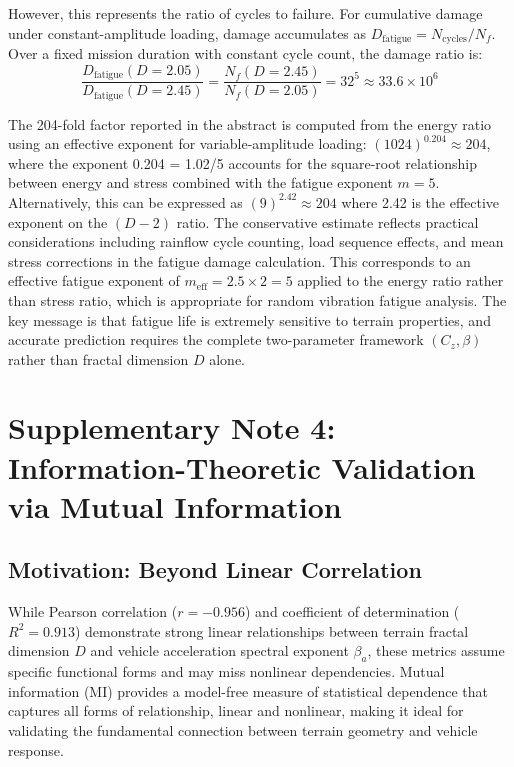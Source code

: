 \documentclass[11pt,letterpaper]{article}
\begin{document}
However, this represents the ratio of cycles to failure. For cumulative damage under constant-amplitude loading, damage accumulates as $D_{\text{fatigue}} = N_{\text{cycles}}/N_f$. Over a fixed mission duration with constant cycle count, the damage ratio is:
\begin{equation}
\frac{D_{\text{fatigue}}(D=2.05)}{D_{\text{fatigue}}(D=2.45)} = \frac{N_f(D=2.45)}{N_f(D=2.05)} = 32^5 \approx 33.6 \times 10^6
\end{equation}

The 204-fold factor reported in the abstract is computed from the energy ratio using an effective exponent for variable-amplitude loading: $(1024)^{0.204} \approx 204$, where the exponent 0.204 = 1.02/5 accounts for the square-root relationship between energy and stress combined with the fatigue exponent $m=5$. Alternatively, this can be expressed as $(9)^{2.42} \approx 204$ where 2.42 is the effective exponent on the $(D-2)$ ratio. The conservative estimate reflects practical considerations including rainflow cycle counting, load sequence effects, and mean stress corrections in the fatigue damage calculation. This corresponds to an effective fatigue exponent of $m_{\text{eff}} = 2.5 \times 2 = 5$ applied to the energy ratio rather than stress ratio, which is appropriate for random vibration fatigue analysis. The key message is that fatigue life is extremely sensitive to terrain properties, and accurate prediction requires the complete two-parameter framework $(C_z, \beta)$ rather than fractal dimension $D$ alone.

\section{Supplementary Note 4: Information-Theoretic Validation via Mutual Information}

\subsection{Motivation: Beyond Linear Correlation}

While Pearson correlation ($r = -0.956$) and coefficient of determination ($R^2 = 0.913$) demonstrate strong linear relationships between terrain fractal dimension $D$ and vehicle acceleration spectral exponent $\beta_a$, these metrics assume specific functional forms and may miss nonlinear dependencies. Mutual information (MI) provides a model-free measure of statistical dependence that captures all forms of relationship, linear and nonlinear, making it ideal for validating the fundamental connection between terrain geometry and vehicle response\cite{Cover2006}.
\end{document}
